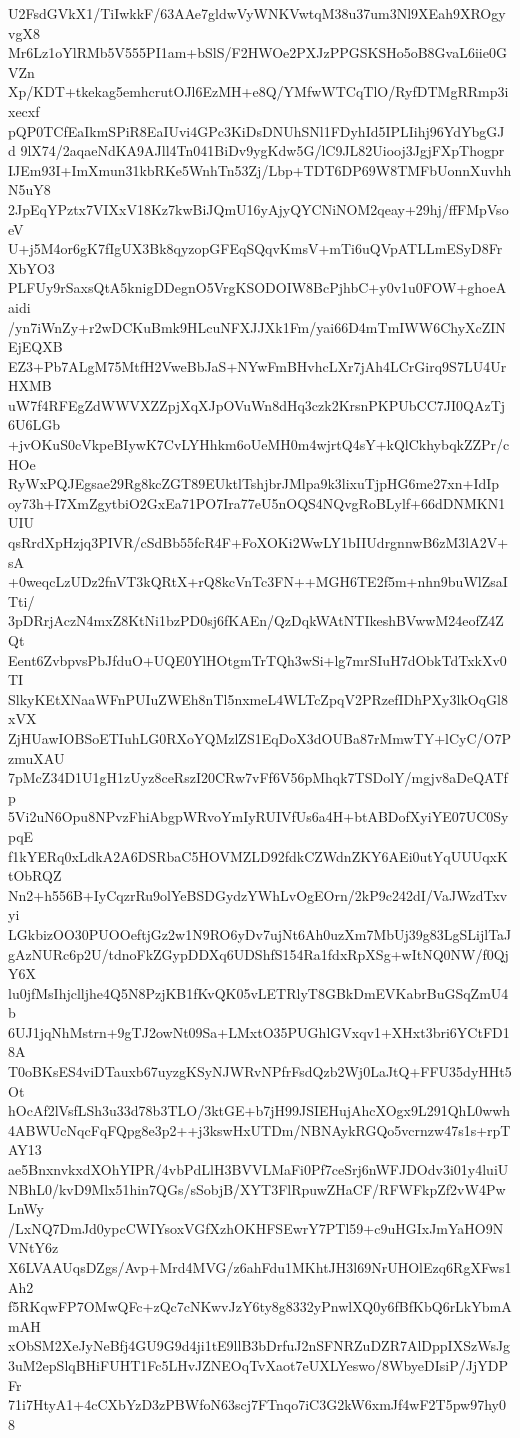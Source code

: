 U2FsdGVkX1/TiIwkkF/63AAe7gldwVyWNKVwtqM38u37um3Nl9XEah9XROgyvgX8
Mr6Lz1oYlRMb5V555PI1am+bSlS/F2HWOe2PXJzPPGSKSHo5oB8GvaL6iie0GVZn
Xp/KDT+tkekag5emhcrutOJl6EzMH+e8Q/YMfwWTCqTlO/RyfDTMgRRmp3ixecxf
pQP0TCfEaIkmSPiR8EaIUvi4GPc3KiDsDNUhSNl1FDyhId5IPLIihj96YdYbgGJd
9lX74/2aqaeNdKA9AJll4Tn041BiDv9ygKdw5G/lC9JL82Uiooj3JgjFXpThogpr
IJEm93I+ImXmun31kbRKe5WnhTn53Zj/Lbp+TDT6DP69W8TMFbUonnXuvhhN5uY8
2JpEqYPztx7VIXxV18Kz7kwBiJQmU16yAjyQYCNiNOM2qeay+29hj/ffFMpVsoeV
U+j5M4or6gK7fIgUX3Bk8qyzopGFEqSQqvKmsV+mTi6uQVpATLLmESyD8FrXbYO3
PLFUy9rSaxsQtA5knigDDegnO5VrgKSODOIW8BcPjhbC+y0v1u0FOW+ghoeAaidi
/yn7iWnZy+r2wDCKuBmk9HLcuNFXJJXk1Fm/yai66D4mTmIWW6ChyXcZINEjEQXB
EZ3+Pb7ALgM75MtfH2VweBbJaS+NYwFmBHvhcLXr7jAh4LCrGirq9S7LU4UrHXMB
uW7f4RFEgZdWWVXZZpjXqXJpOVuWn8dHq3czk2KrsnPKPUbCC7JI0QAzTj6U6LGb
+jvOKuS0cVkpeBIywK7CvLYHhkm6oUeMH0m4wjrtQ4sY+kQlCkhybqkZZPr/cHOe
RyWxPQJEgsae29Rg8kcZGT89EUktlTshjbrJMlpa9k3lixuTjpHG6me27xn+IdIp
oy73h+I7XmZgytbiO2GxEa71PO7Ira77eU5nOQS4NQvgRoBLylf+66dDNMKN1UIU
qsRrdXpHzjq3PIVR/cSdBb55fcR4F+FoXOKi2WwLY1bIIUdrgnnwB6zM3lA2V+sA
+0weqcLzUDz2fnVT3kQRtX+rQ8kcVnTc3FN++MGH6TE2f5m+nhn9buWlZsaITti/
3pDRrjAczN4mxZ8KtNi1bzPD0sj6fKAEn/QzDqkWAtNTIkeshBVwwM24eofZ4ZQt
Eent6ZvbpvsPbJfduO+UQE0YlHOtgmTrTQh3wSi+lg7mrSIuH7dObkTdTxkXv0TI
SlkyKEtXNaaWFnPUIuZWEh8nTl5nxmeL4WLTcZpqV2PRzefIDhPXy3lkOqGl8xVX
ZjHUawIOBSoETIuhLG0RXoYQMzlZS1EqDoX3dOUBa87rMmwTY+lCyC/O7PzmuXAU
7pMcZ34D1U1gH1zUyz8ceRszI20CRw7vFf6V56pMhqk7TSDolY/mgjv8aDeQATfp
5Vi2uN6Opu8NPvzFhiAbgpWRvoYmIyRUIVfUs6a4H+btABDofXyiYE07UC0SypqE
f1kYERq0xLdkA2A6DSRbaC5HOVMZLD92fdkCZWdnZKY6AEi0utYqUUUqxKtObRQZ
Nn2+h556B+IyCqzrRu9olYeBSDGydzYWhLvOgEOrn/2kP9c242dI/VaJWzdTxvyi
LGkbizOO30PUOOeftjGz2w1N9RO6yDv7ujNt6Ah0uzXm7MbUj39g83LgSLijlTaJ
gAzNURc6p2U/tdnoFkZGypDDXq6UDShfS154Ra1fdxRpXSg+wItNQ0NW/f0QjY6X
lu0jfMsIhjclljhe4Q5N8PzjKB1fKvQK05vLETRlyT8GBkDmEVKabrBuGSqZmU4b
6UJ1jqNhMstrn+9gTJ2owNt09Sa+LMxtO35PUGhlGVxqv1+XHxt3bri6YCtFD18A
T0oBKsES4viDTauxb67uyzgKSyNJWRvNPfrFsdQzb2Wj0LaJtQ+FFU35dyHHt5Ot
hOcAf2lVsfLSh3u33d78b3TLO/3ktGE+b7jH99JSIEHujAhcXOgx9L291QhL0wwh
4ABWUcNqcFqFQpg8e3p2++j3kswHxUTDm/NBNAykRGQo5vcrnzw47s1s+rpTAY13
ae5BnxnvkxdXOhYIPR/4vbPdLlH3BVVLMaFi0Pf7ceSrj6nWFJDOdv3i01y4luiU
NBhL0/kvD9Mlx51hin7QGs/sSobjB/XYT3FlRpuwZHaCF/RFWFkpZf2vW4PwLnWy
/LxNQ7DmJd0ypcCWIYsoxVGfXzhOKHFSEwrY7PTl59+c9uHGIxJmYaHO9NVNtY6z
X6LVAAUqsDZgs/Avp+Mrd4MVG/z6ahFdu1MKhtJH3l69NrUHOlEzq6RgXFws1Ah2
f5RKqwFP7OMwQFc+zQc7cNKwvJzY6ty8g8332yPnwlXQ0y6fBfKbQ6rLkYbmAmAH
xObSM2XeJyNeBfj4GU9G9d4ji1tE9llB3bDrfuJ2nSFNRZuDZR7AlDppIXSzWsJg
3uM2epSlqBHiFUHT1Fc5LHvJZNEOqTvXaot7eUXLYeswo/8WbyeDIsiP/JjYDPFr
71i7HtyA1+4cCXbYzD3zPBWfoN63scj7FTnqo7iC3G2kW6xmJf4wF2T5pw97hy08
